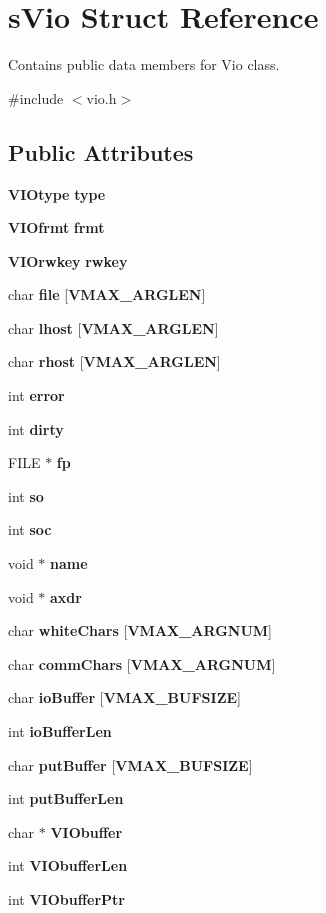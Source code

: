 \section{s\+Vio Struct Reference}
\label{a00002}


Contains public data members for Vio class.  




{\ttfamily \#include $<$vio.\+h$>$}

\subsection*{Public Attributes}
\begin{DoxyCompactItemize}
\item 
{\bf V\+I\+Otype} {\bf type}
\item 
{\bf V\+I\+Ofrmt} {\bf frmt}
\item 
{\bf V\+I\+Orwkey} {\bf rwkey}
\item 
char {\bf file} [{\bf V\+M\+A\+X\+\_\+\+A\+R\+G\+L\+E\+N}]
\item 
char {\bf lhost} [{\bf V\+M\+A\+X\+\_\+\+A\+R\+G\+L\+E\+N}]
\item 
char {\bf rhost} [{\bf V\+M\+A\+X\+\_\+\+A\+R\+G\+L\+E\+N}]
\item 
int {\bf error}
\item 
int {\bf dirty}
\item 
F\+I\+L\+E $\ast$ {\bf fp}
\item 
int {\bf so}
\item 
int {\bf soc}
\item 
void $\ast$ {\bf name}
\item 
void $\ast$ {\bf axdr}
\item 
char {\bf white\+Chars} [{\bf V\+M\+A\+X\+\_\+\+A\+R\+G\+N\+U\+M}]
\item 
char {\bf comm\+Chars} [{\bf V\+M\+A\+X\+\_\+\+A\+R\+G\+N\+U\+M}]
\item 
char {\bf io\+Buffer} [{\bf V\+M\+A\+X\+\_\+\+B\+U\+F\+S\+I\+Z\+E}]
\item 
int {\bf io\+Buffer\+Len}
\item 
char {\bf put\+Buffer} [{\bf V\+M\+A\+X\+\_\+\+B\+U\+F\+S\+I\+Z\+E}]
\item 
int {\bf put\+Buffer\+Len}
\item 
char $\ast$ {\bf V\+I\+Obuffer}
\item 
int {\bf V\+I\+Obuffer\+Len}
\item 
int {\bf V\+I\+Obuffer\+Ptr}
\end{DoxyCompactItemize}


